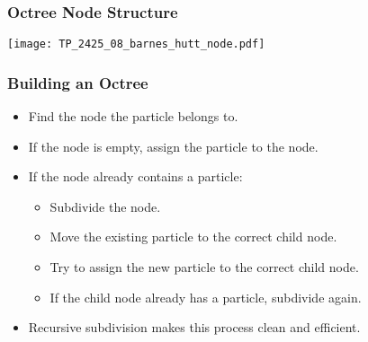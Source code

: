 \begin{frame}
  \frametitle{Octree Node Structure}
    \centering
  \texttt{[image: TP\_2425\_08\_barnes\_hutt\_node.pdf]}
\end{frame}

\begin{frame}
  \frametitle{Building an Octree}
  \begin{itemize}
    \item Find the node the particle belongs to.
    \item If the node is empty, assign the particle to the node.
    \item If the node already contains a particle:
      \begin{itemize}
        \item Subdivide the node.
        \item Move the existing particle to the correct child node.
        \item Try to assign the new particle to the correct child node.
        \item If the child node already has a particle, subdivide again.
      \end{itemize}
    \item Recursive subdivision makes this process clean and efficient.
  \end{itemize}
\end{frame}




